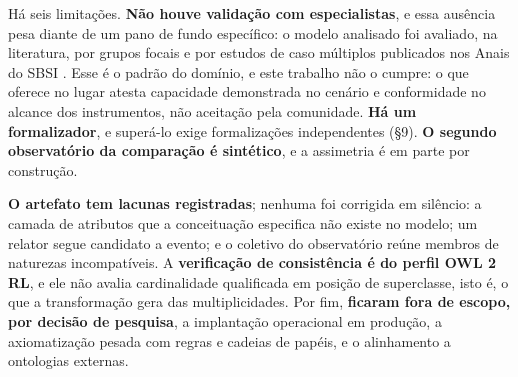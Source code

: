 Há seis limitações. \textbf{Não houve validação com especialistas}, e essa ausência pesa diante de um pano de fundo específico: o modelo analisado foi avaliado, na literatura, por grupos focais e por estudos de caso múltiplos publicados nos Anais do SBSI \cite{vieira2022evaluating,vieira2023survey}. Esse é o padrão do domínio, e este trabalho não o cumpre: o que oferece no lugar atesta capacidade demonstrada no cenário e conformidade no alcance dos instrumentos, não aceitação pela comunidade. \textbf{Há um formalizador}, e superá-lo exige formalizações independentes (\S{}9). \textbf{O segundo observatório da comparação é sintético}, e a assimetria é em parte por construção.

\textbf{O artefato tem lacunas registradas}; nenhuma foi corrigida em silêncio: a camada de atributos que a conceituação especifica não existe no modelo; um relator segue candidato a evento; e o coletivo do observatório reúne membros de naturezas incompatíveis. A \textbf{verificação de consistência é do perfil OWL 2 RL}, e ele não avalia cardinalidade qualificada em posição de superclasse, isto é, o que a transformação gera das multiplicidades. Por fim, \textbf{ficaram fora de escopo, por decisão de pesquisa}, a implantação operacional em produção, a axiomatização pesada com regras e cadeias de papéis, e o alinhamento a ontologias externas.
